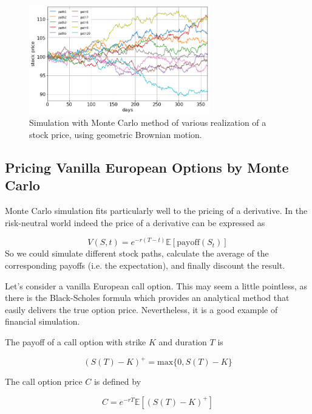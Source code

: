 \begin{figure}[htb]
\centering
\includegraphics[width=0.7\textwidth]{figures/asset_price_simulation}
\caption{Simulation with Monte Carlo method of various realization of a stock price, using geometric Brownian motion.}
\label{fig:stock_price_sim}
\end{figure}

\subsection{Pricing Vanilla European Options by Monte Carlo}
Monte Carlo simulation fits particularly well to the pricing of a derivative. In the risk-neutral world indeed the price of a derivative can be expressed as

\begin{equation}
V(S, t) = e^{-r(T-t)} \mathbb{E}[\textrm{payoff}(S_t)]
\end{equation}
So we could simulate different stock paths, calculate the average of the corresponding payoffs (i.e. the expectation), and finally discount the result.

Let's consider a vanilla European call option. This may seem a little pointless, as there is the Black-Scholes formula which provides an analytical method that easily delivers the true option price. Nevertheless, it is a good example of financial simulation. 

The payoff of a call option with strike $K$ and duration $T$ is 

\begin{equation}
(S(T)−K)^+ = \textrm{max}\{0,S(T)−K\}
\end{equation}

The call option price $C$ is defined by

\begin{equation} 
C = e^{−rT} \mathbb{E}[(S(T) −K)^+ ]
\label{eq:call_payoff}
\end{equation}

